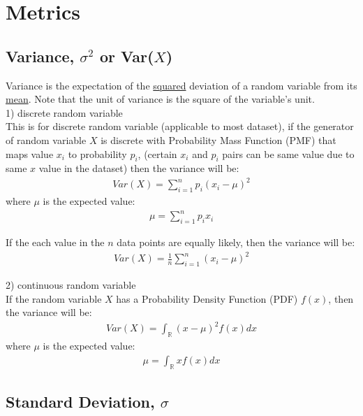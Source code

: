 \graphicspath{%
{chapter2graph/}%
{chapter2graph/bg/}}


\chapter{Metrics}

\section{Variance, $\sigma^2$ or Var($X$)}

Variance is the expectation of the \underline{squared} deviation of a random variable from its \underline{mean}.  Note that the unit of variance is the square of the variable's unit. \\

1) discrete random variable\\
This is for discrete random variable (applicable to most dataset), if the generator of random variable $X$ is discrete with Probability Mass Function (PMF) that maps value $x_i$ to probability $p_i$, (certain $x_i$ and $p_i$ pairs can be same value due to same $x$ value in the dataset) then the variance will be:
\begin{eqnarray}
Var(X) = \sum_{i=1}^{n} p_i (x_i - \mu)^2
\label{variancedis}
\end{eqnarray}
where $\mu$ is the expected value:
\begin{eqnarray}
\mu = \sum_{i=1}^{n} p_i x_i
\label{expected}
\end{eqnarray}

If the each value in the $n$ data points are equally likely, then the variance will be:
\begin{eqnarray}
Var(X)= \frac{1}{n}\sum^{n}_{i=1}(x_i - \mu)^2
\label{variancediseq}
\end{eqnarray}

2) continuous random variable\\
If the random variable $X$ has a Probability Density Function (PDF) $f(x)$, then the variance will be:
\begin{eqnarray}
Var(X) = \int_{\mathbb{R}} (x - \mu)^2 f(x) dx
\label{variancecon}
\end{eqnarray}
where $\mu$ is the expected value:
\begin{eqnarray}
\mu = \int_{\mathbb{R}} xf(x)dx
\label{expectedcon}
\end{eqnarray}

\section{Standard Deviation, $\sigma$}

